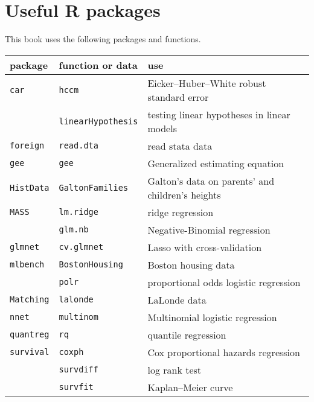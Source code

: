 \chapter*{Useful R packages}


This book uses the following  packages and functions. 

\begin{tabular}{lll}
package & function or data & use \\
\hline 
\texttt{car} & \texttt{hccm} & Eicker--Huber--White robust standard error\\
& \texttt{linearHypothesis} & testing linear hypotheses in linear models\\
\texttt{foreign} & \texttt{read.dta} & read stata data\\
\texttt{gee} & \texttt{gee} & Generalized estimating equation\\
\texttt{HistData} & \texttt{GaltonFamilies} & Galton's data on parents' and children's heights\\ 
\texttt{MASS} & \texttt{lm.ridge} & ridge regression\\
& \texttt{glm.nb} & Negative-Binomial regression \\
\texttt{glmnet}  & \texttt{cv.glmnet}  & Lasso with cross-validation \\ 
\texttt{mlbench}  & \texttt{BostonHousing}  & Boston housing data \\ 
& \texttt{polr} & proportional odds logistic regression \\ 
\texttt{Matching} & \texttt{lalonde} & LaLonde data\\
\texttt{nnet} & \texttt{multinom} & Multinomial logistic regression\\
\texttt{quantreg} & \texttt{rq} & quantile regression\\
\texttt{survival} & \texttt{coxph} & Cox proportional hazards regression\\ 
& \texttt{survdiff} & log rank test\\
& \texttt{survfit} & Kaplan--Meier curve \\
\end{tabular}

